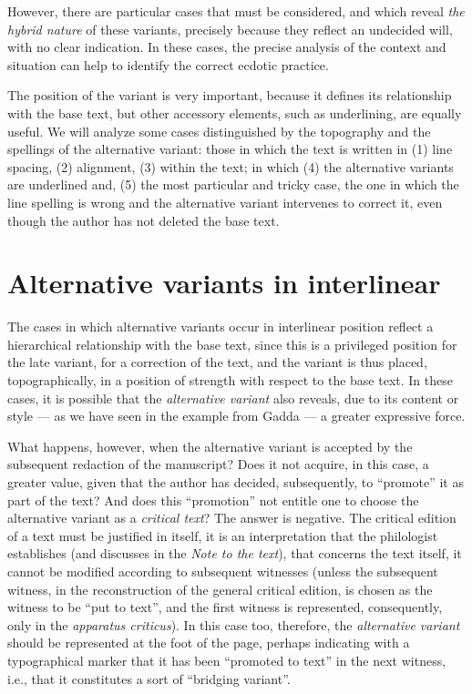\begin{paper}
\noindent However, there are particular cases that must be considered, and which
reveal \emph{the hybrid nature} of these variants, precisely because
they reflect an undecided will, with no clear indication. In these
cases, the precise analysis of the context and situation can help to
identify the correct ecdotic practice.

The position of the variant is very important, because it defines its
relationship with the base text, but other accessory elements, such as
underlining, are equally useful. We will analyze some cases
distinguished by the topography and the spellings of the alternative
variant: those in which the text is written in (1) line spacing, (2)
alignment, (3) within the text; in which (4) the alternative variants
are underlined and, (5) the most particular and tricky case, the one in
which the line spelling is wrong and the alternative variant intervenes
to correct it, even though the author has not deleted the base text.

\section{Alternative variants in interlinear}

The cases in which alternative variants occur in interlinear position
reflect a hierarchical relationship with the base text, since this is a
privileged position for the late variant, for a correction of the text,
and the variant is thus placed, topographically, in a position of
strength with respect to the base text. In these cases, it is possible
that the \emph{alternative variant} also reveals, due to its content or
style –– as we have seen in the example from Gadda –– a greater
expressive force.

What happens, however, when the alternative variant is accepted by the
subsequent redaction of the manuscript? Does it not acquire, in this
case, a greater value, given that the author has decided, subsequently,
to ``promote'' it as part of the text? And does this ``promotion'' not
entitle one to choose the alternative variant as a \emph{critical text}?
The answer is negative. The critical edition of a text must be
justified in itself, it is an interpretation that the philologist
establishes (and discusses in the \emph{Note to the text}), that
concerns the text itself, it cannot be modified according to subsequent
witnesses (unless the subsequent witness, in the reconstruction of the
general critical edition, is chosen as the witness to be ``put to text'',
and the first witness is represented, consequently, only in the
\emph{apparatus criticus}). In this case too, therefore, the
\emph{alternative variant} should be represented at the foot of the
page, perhaps indicating with a typographical marker that it has been
``promoted to text'' in the next witness, i.e., that it constitutes a sort
of ``bridging variant''.


\end{paper}
